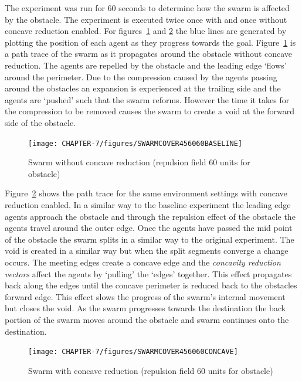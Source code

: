The experiment was run for 60 seconds to determine how the swarm is affected by the obstacle. The experiment is executed twice once with and once without concave reduction enabled. For figures~\ref{voids:ObstacleTest2} and \ref{voids:ObstacleTest3} the blue lines are generated by plotting the position of each agent as they progress towards the goal. Figure~\ref{voids:ObstacleTest2} is a path trace of the swarm as it propagates around the obstacle without concave reduction. The agents are repelled by the obstacle and the leading edge `flows' around the perimeter. Due to the compression caused by the agents passing around the obstacles an expansion is experienced at the trailing side and the agents are `pushed' such that the swarm reforms. However the time it takes for the compression to be removed causes the swarm to create a void at the forward side of the obstacle.  

\begin{figure}[H]
\begin{center}
\texttt{[image: CHAPTER-7/figures/SWARMCOVER456060BASELINE]}
\end{center}
\caption{Swarm without concave reduction (repulsion field 60 units for obstacle)\label{voids:ObstacleTest2}}
\end{figure}

Figure~\ref{voids:ObstacleTest3} shows the path trace for the same environment settings with concave reduction enabled. In a similar way to the baseline experiment the leading edge agents approach the obstacle and through the repulsion effect of the obstacle the agents travel around the outer edge. Once the agents have passed the mid point of the obstacle the swarm splits in a similar way to the original experiment. The void is created in a similar way but when the split segments converge a change occurs. The meeting edges create a concave edge and the \textit{concavity reduction vectors} affect the agents by `pulling' the `edges' together. This effect propagates back along the edges until the concave perimeter is reduced back to the obstacles forward edge. This effect slows the progress of the swarm's internal movement but closes the void. As the swarm progresses towards the destination the back portion of the swarm moves around the obstacle and swarm continues onto the destination.

\begin{figure}[H]
\begin{center}
\texttt{[image: CHAPTER-7/figures/SWARMCOVER456060CONCAVE]}
\end{center}
\caption{Swarm with concave reduction (repulsion field 60 units for obstacle)\label{voids:ObstacleTest3}}
\end{figure}

